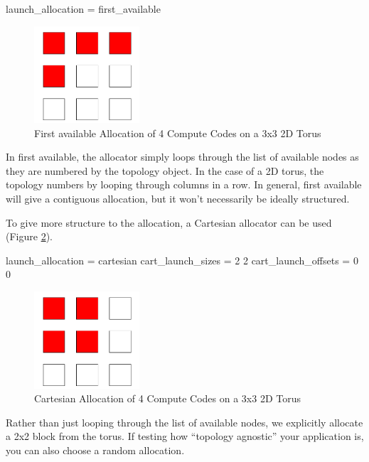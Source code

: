 \begin{ViFile}
launch_allocation = first_available
\end{ViFile}
\begin{figure}[h]
\centering
\includegraphics[width=0.35\textwidth]{figures/tikz/allocation/firstavailable.pdf}
\caption{First available Allocation of 4 Compute Codes on a 3x3 2D Torus}
\label{fig:allocation:first_available}
\end{figure}
In first available, the allocator simply loops through the list of available nodes as they are numbered by the topology object.
In the case of a 2D torus, the topology numbers by looping through columns in a row.
In general, first available will give a contiguous allocation, but it won't necessarily be ideally structured.

To give more structure to the allocation, a Cartesian allocator can be used (Figure \ref{fig:allocation:cartesian}).

\begin{ViFile}
launch_allocation = cartesian
cart_launch_sizes = 2 2
cart_launch_offsets = 0 0
\end{ViFile}
\begin{figure}[h]
\centering
\includegraphics[width=0.35\textwidth]{figures/tikz/allocation/cartesian.pdf}
\caption{Cartesian Allocation of 4 Compute Codes on a 3x3 2D Torus}
\label{fig:allocation:cartesian}
\end{figure}
Rather than just looping through the list of available nodes, we explicitly allocate a 2x2 block from the torus.
If testing how ``topology agnostic'' your application is, you can also choose a random allocation.


